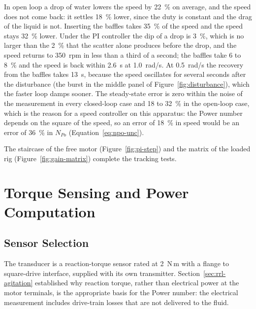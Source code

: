 In open loop a drop of water lowers the speed by 22~\% on average, and the speed does not come back: it settles 18~\% lower, since the duty is constant and the drag of the liquid is not. Inserting the baffles takes 35~\% of the speed and the speed stays 32~\% lower. Under the PI controller the dip of a drop is 3~\%, which is no larger than the 2~\% that the scatter alone produces before the drop, and the speed returns to 350~rpm in less than a third of a second; the baffles take 6 to 8~\% and the speed is back within 2.6~s at 1.0~rad/s. At 0.5~rad/s the recovery from the baffles takes 13~s, because the speed oscillates for several seconds after the disturbance (the burst in the middle panel of Figure~\ref{fig:disturbance}), which the faster loop damps sooner. The steady-state error is zero within the noise of the measurement in every closed-loop case and 18 to 32~\% in the open-loop case, which is the reason for a speed controller on this apparatus: the Power number depends on the square of the speed, so an error of 18~\% in speed would be an error of 36~\% in $N_{Po}$ (Equation~\ref{eq:npo-unc}).

The staircase of the free motor (Figure~\ref{fig:pi-step}) and the matrix of the loaded rig (Figure~\ref{fig:gain-matrix}) complete the tracking tests.



\section{Torque Sensing and Power Computation}
\label{sec:agit-torque}

\subsection{Sensor Selection}
\label{subsec:agit-torque-sel}

The transducer is a reaction-torque sensor rated at 2~N\,m with a flange to square-drive interface, supplied with its own transmitter. Section~\ref{sec:rrl-agitation} established why reaction torque, rather than electrical power at the motor terminals, is the appropriate basis for the Power number: the electrical measurement includes drive-train losses that are not delivered to the fluid.

